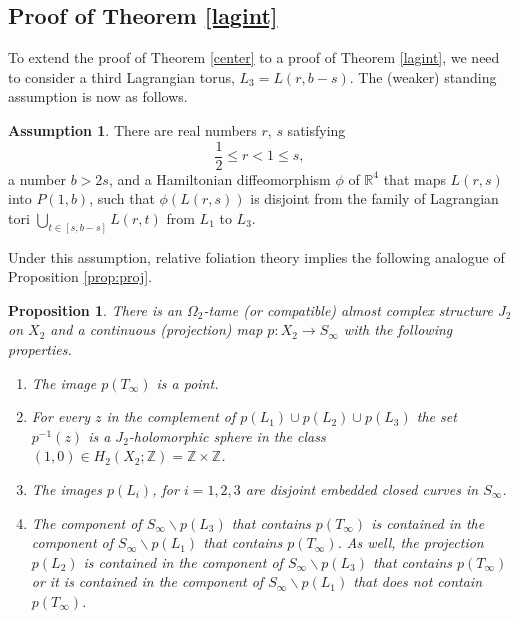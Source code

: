 \documentclass[12pt]{amsart}
\newtheorem{proposition}[theorem]{Proposition}
\theoremstyle{definition}
\newtheorem{assumption}[theorem]{Assumption}
\newcommand{\RR}{{\mathbb R}}
\newcommand{\ZZ}{{\mathbb Z}}
\begin{document}
\subsection{Proof of Theorem \ref{lagint}}\label{adjust}
 
To extend the proof of Theorem \ref{center} to a proof of Theorem \ref{lagint}, we need to consider a third Lagrangian torus, $L_3=L(r, b-s)$. The (weaker) standing assumption is now as follows.

\begin{assumption}\label{assump2}
There are real numbers $r$, $s$ satisfying 
\[ \frac{1}{2} \leq r <1 \leq s,\]
a number $b>2s$, and a Hamiltonian diffeomorphism $\phi$ of $\RR^4$ that maps $L(r,s)$ into $P(1,b)$, such that  $\phi(L(r,s))$ is disjoint from the family of Lagrangian tori $\bigcup_{t \in [s,b-s]} L(r, t)$ from $L_1$ to $L_3$.
\end{assumption}



Under this assumption, relative foliation theory implies the following analogue of Proposition \ref{prop:proj}.


\begin{proposition}\label{adjustprop} There is an $\Omega_2$-tame (or compatible) almost complex structure $J_2$ on $X_2$  and a continuous (projection) map $p \colon X_2 \to S_{\infty}$ with the following properties.
\begin{enumerate}
    \item The image $p(T_{\infty})$ is a point.\\
    \item For every $z$ in the complement of $p(L_1) \cup p(L_2)  \cup p(L_3)$ the set $p^{-1}(z)$ is a $J_2$-holomorphic sphere in the class $(1,0) \in H_2(X_2;\ZZ) = \ZZ \times \ZZ$.\\
    \item The images $p(L_i)$, for $i= 1,2,3$ are disjoint embedded closed curves in $S_{\infty}$.\\
    \item The component of $S_\infty \smallsetminus p(L_3)$ that contains $p(T_\infty)$ is contained in the component of $S_\infty \smallsetminus p(L_1)$ that contains $p(T_\infty)$. As well, the projection $p(L_2)$ is contained in the component of $S_\infty \smallsetminus p(L_3)$ that contains $p(T_\infty)$ or it is contained in the component of $S_\infty \smallsetminus p(L_1)$ that does not contain $p(T_\infty)$.
\end{enumerate}
\end{proposition}
\end{document}
